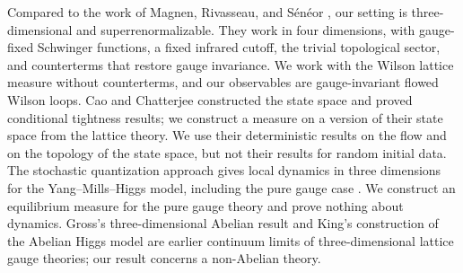 Compared to the work of Magnen, Rivasseau, and S\'en\'eor \cite{MagnenRivasseauSeneor1993}, our setting is three-dimensional and superrenormalizable. They work in four dimensions, with gauge-fixed Schwinger functions, a fixed infrared cutoff, the trivial topological sector, and counterterms that restore gauge invariance. We work with the Wilson lattice measure without counterterms, and our observables are gauge-invariant flowed Wilson loops. Cao and Chatterjee \cite{CCState2023v4} constructed the state space and proved conditional tightness results; we construct a measure on a version of their state space from the lattice theory. We use their deterministic results on the flow and on the topology of the state space, but not their results for random initial data. The stochastic quantization approach gives local dynamics in three dimensions for the Yang--Mills--Higgs model, including the pure gauge case \cite{ChandraChevyrevHairerShen2024,ChevyrevShen2026Uniqueness}. We construct an equilibrium measure for the pure gauge theory and prove nothing about dynamics. Gross's three-dimensional Abelian result \cite{Gross1983Abelian} and King's construction of the Abelian Higgs model \cite{King1986a,King1986b} are earlier continuum limits of three-dimensional lattice gauge theories; our result concerns a non-Abelian theory.

